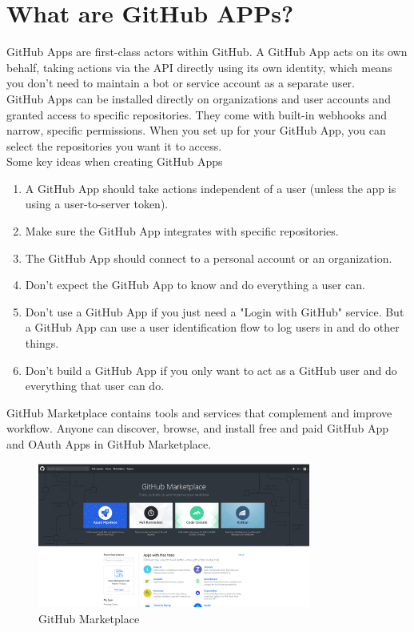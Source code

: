 \documentclass[12pt,a4paper]{report}
\begin{document}
\section{What are GitHub APPs?}
GitHub Apps are first-class actors within GitHub. A GitHub App acts on its own behalf, taking actions via the API directly using its own identity, which means you don't need to maintain a bot or service account as a separate user.\\
GitHub Apps can be installed directly on organizations and user accounts and granted access to specific repositories. They come with built-in webhooks and narrow, specific permissions. When you set up for your GitHub App, you can select the repositories you want it to access.\\
Some key ideas when creating GitHub Apps
\begin{enumerate}
	\renewcommand{\labelenumi}{{\textbf{\arabic{enumi}.}}}
	\item A GitHub App should take actions independent of a user (unless the app is using a user-to-server token).
	\item Make sure the GitHub App integrates with specific repositories.
	\item The GitHub App should connect to a personal account or an organization.
	\item Don't expect the GitHub App to know and do everything a user can.
	\item Don't use a GitHub App if you just need a "Login with GitHub" service. But a GitHub App can use a user identification flow to log users in and do other things.
	\item Don't build a GitHub App if you only want to act as a GitHub user and do everything that user can do.
\end{enumerate}
GitHub Marketplace contains tools and services that complement and improve workflow. Anyone can discover, browse, and install free and paid GitHub App and OAuth Apps in GitHub Marketplace.
\begin{figure}[H]
	\centering
	\includegraphics[width=0.8\textwidth]{./pics/githubMarket.png}
	\caption{GitHub Marketplace}
\end{figure}
\end{document}
